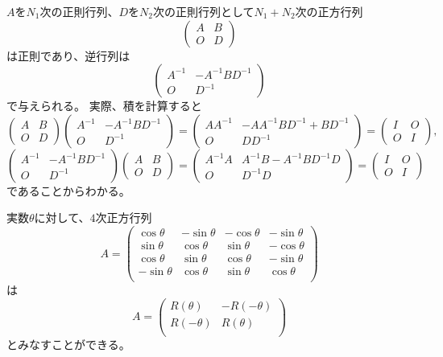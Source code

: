 \begin{example}
\label{t:blockinv}
$A$を$N_1$次の正則行列、$D$を$N_2$次の正則行列として$N_1+N_2$次の正方行列
$$
\begin{pmatrix}A & B \\ O & D\end{pmatrix}
$$
は正則であり、逆行列は
$$
\begin{pmatrix}A^{-1} & -A^{-1}B D^{-1} \\ O & D^{-1}\end{pmatrix}
$$
で与えられる。
実際、積を計算すると
$$
\begin{pmatrix}A & B \\ O & D\end{pmatrix}\begin{pmatrix}A^{-1} & -A^{-1}B D^{-1} \\ O & D^{-1}\end{pmatrix}
= \begin{pmatrix}A A^{-1} & -A A^{-1}B D^{-1}+B D^{-1} \\ O & D D^{-1}\end{pmatrix}
= \begin{pmatrix}I & O \\ O & I\end{pmatrix},
$$
$$
\begin{pmatrix}A^{-1} & -A^{-1}B D^{-1} \\ O & D^{-1}\end{pmatrix}\begin{pmatrix}A & B \\ O & D\end{pmatrix}
= \begin{pmatrix}A^{-1}A & A^{-1}B-A^{-1}B D^{-1}D \\ O & D^{-1}D\end{pmatrix}
= \begin{pmatrix}I & O \\ O & I\end{pmatrix}
$$
であることからわかる。
\end{example}

\begin{example}
実数$\theta$に対して、$4$次正方行列
$$
A =
\begin{pmatrix}
\cos\theta & -\sin\theta & -\cos\theta & -\sin\theta \\
\sin\theta & \cos\theta & \sin\theta & -\cos\theta \\
\cos\theta & \sin\theta & \cos\theta & -\sin\theta \\
-\sin\theta & \cos\theta & \sin\theta & \cos\theta \\
\end{pmatrix}
$$
は
$$
A =
\begin{pmatrix}
R(\theta) & -R(-\theta) \\
R(-\theta) & R(\theta) \\
\end{pmatrix}
$$
とみなすことができる。
\end{example}
